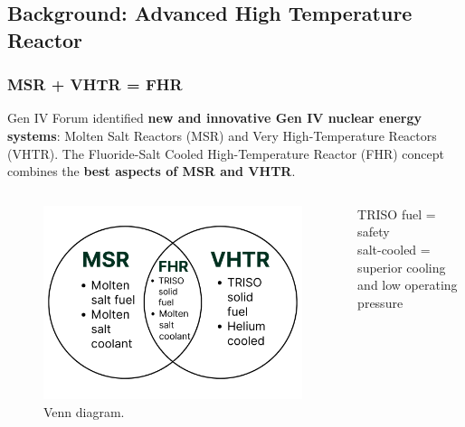 \subsection{Background: Advanced High Temperature Reactor}
    \begin{frame}
        \frametitle{MSR + VHTR = FHR}
        Gen IV Forum identified \textbf{new and innovative Gen IV nuclear energy systems}: 
        Molten Salt Reactors (MSR) and Very High-Temperature Reactors (VHTR). 
        \vspace{0.2cm}
        The Fluoride-Salt Cooled High-Temperature Reactor (FHR) concept combines 
        the \textbf{best aspects of MSR and VHTR}.
        \vspace{-0.2cm}
        \begin{columns}
        \begin{column}{0.7\textwidth}
        \begin{figure}[]
            \centering
            \includegraphics[width=\linewidth]{figures/fhr_venn.png} 
            \caption{Venn diagram.}
        \end{figure}
        \end{column}
        \begin{column}{0.3\textwidth}
            TRISO fuel = safety
            \\
            salt-cooled = superior cooling and low operating pressure 
        \end{column}
    \end{columns}
        \end{frame}

